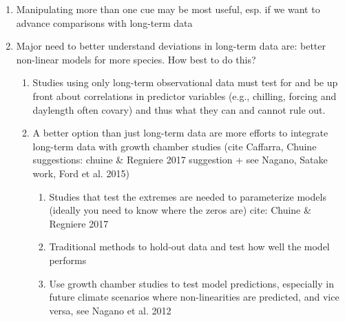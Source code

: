 \documentclass[11pt,letterpaper]{article}
\begin{document}
\begin{enumerate}
\begin{enumerate}
\begin{enumerate}
\end{enumerate}
\item Manipulating more than one cue may be most useful, esp. if we want to advance comparisons with long-term data
\item Major need to better understand deviations in long-term data are: better non-linear models for more species. How best to do this?
\begin{enumerate}
\item Studies using only long-term observational data must test for and be up front about correlations in predictor variables (e.g., chilling, forcing and daylength often covary) and thus what they can and cannot rule out.  %
\item A better option than just long-term data are more efforts to integrate long-term data with growth chamber studies (cite Caffarra, Chuine suggestions: chuine \& Regniere 2017 suggestion + see Nagano, Satake work, Ford et al. 2015) %
\begin{enumerate}
\item Studies that test the extremes are needed to parameterize models (ideally you need to know where the zeros are) cite:  Chuine \& Regniere 2017
\item Traditional methods to hold-out data and test how well the model performs
\item Use growth chamber studies to test model predictions, especially in future climate scenarios where non-linearities are predicted, and vice versa, see Nagano et al. 2012

\end{enumerate}
\end{enumerate}
\end{enumerate}
\end{enumerate}
\end{document}
